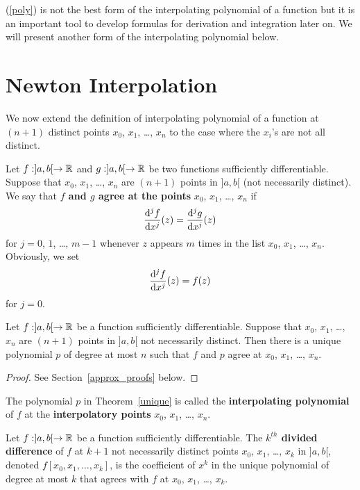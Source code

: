 (\ref{poly}) is not the best form of the interpolating polynomial of a
function but it is an important tool to develop formulas for
derivation and integration later on.  We will present another form of
the interpolating polynomial below.

\section{Newton Interpolation} \label{GenNewtonInter}

We now extend the definition of interpolating polynomial of a function
at $(n+1)$ distinct points $x_0$, $x_1$, \ldots, $x_n$ to the case
where the $x_i$'s are not all distinct.

\begin{defn}
Let $f: ]a,b[ \rightarrow \mathbb{R}$ and $g: ]a,b[ \rightarrow \mathbb{R}$ be two
functions sufficiently differentiable.  Suppose that $x_0$, $x_1$,
\ldots, $x_n$ are $(n+1)$ points in $]a,b[$ (not necessarily
distinct).  We say that
{\bfseries $f$ and $g$ agree at the points}
$x_0$, $x_1$, \ldots, $x_n$ if
\[
\frac{\mathrm{d}^{j}{f}}{\mathrm{d}{x}^{j}}(z) = \frac{\mathrm{d}^{j}{g}}{\mathrm{d}{x}^{j}}(z)
\]
for $j=0$, $1$, \ldots, $m-1$ whenever $z$ appears $m$ times in the list 
$x_0$, $x_1$, \ldots, $x_n$.  Obviously, we set
\[
\frac{\mathrm{d}^{j}{f}}{\mathrm{d}{x}^{j}}(z) = f(z)
\]
for $j=0$.
\end{defn}

\begin{theorem}
Let $f: ]a,b[ \rightarrow \mathbb{R}$ be a function sufficiently
differentiable.  Suppose that $x_0$, $x_1$, \ldots, $x_n$ are $(n+1)$
points in $]a,b[$ not necessarily distinct.
Then there is a unique polynomial $p$ of degree at most
$n$ such that $f$ and $p$ agree at $x_0$, $x_1$, \ldots, $x_n$.
\label{unique}
\end{theorem}

\begin{proof}
See Section~\ref{approx_proofs} below.
\end{proof}

\begin{defn}
The polynomial $p$ in Theorem~\ref{unique} is called the
{\bfseries interpolating polynomial}
of $f$ at the
{\bfseries interpolatory points}
$x_0$, $x_1$, \ldots , $x_n$.
\end{defn}

\begin{defn}
Let $f: ]a,b[ \rightarrow \mathbb{R}$ be a function sufficiently
differentiable.  The
{\bfseries $k^{th}$ divided difference}
of $f$ at $k+1$ not necessarily distinct points $x_0$, $x_1$, \ldots, $x_k$ in
$]a,b[$, denoted $f[x_0,x_1,\ldots,x_k]$, is the coefficient of $x^k$
in the unique polynomial of degree at most $k$ that agrees with $f$ at
$x_0$, $x_1$, \ldots, $x_k$.
\end{defn}

